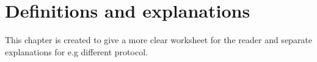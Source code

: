 \chapter{Definitions and explanations}\label{cha:def_exp}

This chapter is created to give a more clear worksheet for the reader and separate explanations for e.g different protocol.







